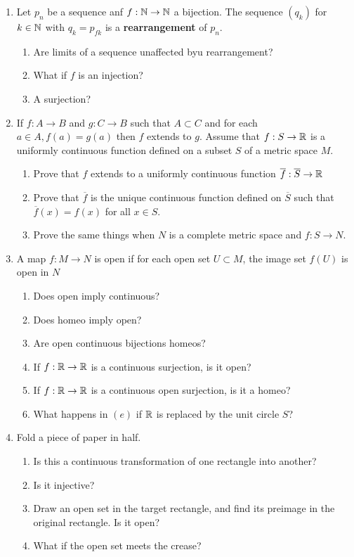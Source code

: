 \documentclass[11pt, a4paper, latinreim, shortsets]{notes}
\begin{document}
\begin{enumerate}[label={\bfseries 2.\arabic*}]
	\item Let $p_n$ be a sequence anf $f : \mathbb{N} \to \mathbb{N}$ a bijection. The sequence $(q_k)$ for
	$k \in \mathbb{N}$ with $q_k = p_{f k}$ is a \textbf{rearrangement} of $p_n$.
	\begin{enumerate}[label=\alph*)]
		\item Are limits of a sequence unaffected byu rearrangement?
		\item What if $f$ is an injection?
		\item A surjection?
	\end{enumerate}

	\item If $f : A \to B$ and $g : C \to B$ such that $A \subset C$ and for each $a \in A,
	f(a) = g(a)$ then $f$ extends to $g$. Assume that $f : S \to \mathbb{R}$ is a uniformly continuous function
	defined on a subset $S$ of a metric space $M$.
	\begin{enumerate}[label=\alph*)]
		\item Prove that $f$ extends to a uniformly continuous function $\overline{f} : \overline{S} \to \mathbb{R}$
		\item Prove that $\overline{f}$ is the unique continuous function defined on $\overline{S}$
			such that $\overline{f}(x) = f(x)$ for all $x \in S$.
		\item Prove the same things when $N$ is a complete metric space and $f : S \to N$.
	\end{enumerate}

	\item A map $f : M \to N$ is open if for each open set $U \subset M$, the image set $f(U)$
	is open in $N$
	\begin{enumerate}[label=\alph*)]
		\item Does open imply continuous?
		\item Does homeo imply open?
		\item Are open continuous bijections homeos?
		\item If $f : \mathbb{R} \to \mathbb{R}$ is a continuous surjection, is it open?
		\item If $f : \mathbb{R} \to \mathbb{R}$ is a continuous open surjection, is it a homeo?
		\item What happens in $(e)$ if $\mathbb{R}$ is replaced by the unit circle $S$?
	\end{enumerate}

	\item Fold a piece of paper in half.
	\begin{enumerate}[label=\alph*)]
		\item Is this a continuous transformation of one rectangle into another?
		\item Is it injective?
		\item Draw an open set in the target rectangle, and find its preimage in the original rectangle.
			Is it open?
		\item What if the open set meets the crease?
		

\end{enumerate}
\end{enumerate}
\end{document}

